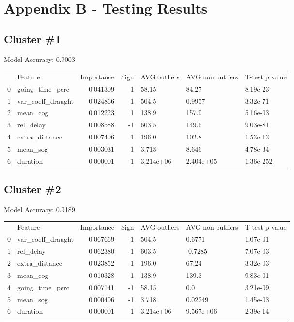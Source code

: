 \chapter{Appendix B - Testing Results}
\label{app:tessting-results}

\section*{Cluster \#1}
Model Accuracy: 0.9003


\begin{tabular}{llrrlll}
 & Feature & Importance & Sign & AVG outliers & AVG non outliers & T-test p value \\
0 & going\_time\_perc & 0.041309 & 1 & 58.15 & 84.27 & 8.19e-23 \\
1 & var\_coeff\_draught & 0.024866 & -1 & 504.5 & 0.9957 & 3.32e-71 \\
2 & mean\_cog & 0.012223 & 1 & 138.9 & 157.9 & 5.16e-03 \\
3 & rel\_delay & 0.008588 & -1 & 603.5 & 149.6 & 9.03e-81 \\
4 & extra\_distance & 0.007406 & -1 & 196.0 & 102.8 & 1.53e-13 \\
5 & mean\_sog & 0.003031 & 1 & 3.718 & 8.646 & 4.78e-34 \\
6 & duration & 0.000001 & -1 & 3.214e+06 & 2.404e+05 & 1.36e-252 \\
\end{tabular}



\section*{Cluster \#2}
Model Accuracy: 0.9189


\begin{tabular}{llrrlll}
 & Feature & Importance & Sign & AVG outliers & AVG non outliers & T-test p value \\
0 & var\_coeff\_draught & 0.067669 & -1 & 504.5 & 0.6771 & 1.07e-01 \\
1 & rel\_delay & 0.062380 & -1 & 603.5 & -0.7285 & 7.07e-03 \\
2 & extra\_distance & 0.023852 & -1 & 196.0 & 67.24 & 3.32e-03 \\
3 & mean\_cog & 0.010328 & -1 & 138.9 & 139.3 & 9.83e-01 \\
4 & going\_time\_perc & 0.007141 & -1 & 58.15 & 0.0 & 3.21e-09 \\
5 & mean\_sog & 0.000406 & -1 & 3.718 & 0.02249 & 1.45e-03 \\
6 & duration & 0.000001 & 1 & 3.214e+06 & 9.567e+06 & 2.39e-14 \\
\end{tabular}



